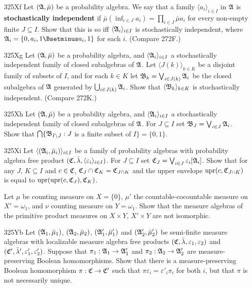 {\sqheader 325Xf Let $(\frak A,\bar\mu)$ be a probability
algebra.   We say that a family $\langle a_i\rangle_{i\in I}$ in
$\frak A$ is {\bf stochastically independent} if
$\bar\mu(\inf_{i\in J}a_i)=\prod_{i\in J}\bar\mu a_i$ for every non-empty
finite $J\subseteq I$.   Show that this is so iff
$\langle\frak A_i\rangle_{i\in I}$ is stochastically
independent, where $\frak A_i=\{0,a_i,1\Bsetminus a_i,1\}$ for each $i$.
(Compare 272F.)

\sqheader 325Xg Let $(\frak A,\bar\mu)$ be a probability
algebra, and $\langle\frak A_i\rangle_{i\in I}$ a stochastically
independent family of closed subalgebras of $\frak A$.   Let
$\langle J(k)\rangle_{k\in K}$ be a disjoint family of subsets of $I$,
and for each $k\in K$ let $\frak B_k=\bigvee_{i\in J(k)}\frak A_i$
be the closed subalgebra of $\frak A$
generated by $\bigcup_{i\in J(k)}\frak A_i$.   Show that
$\langle\frak B_k\rangle_{k\in K}$ is
stochastically independent.   (Compare 272K.)

\spheader 325Xh Let $(\frak A,\bar\mu)$ be a probability
algebra, and $\langle\frak A_i\rangle_{i\in I}$ a stochastically
independent family of closed subalgebras of $\frak A$.   For
$J\subseteq I$ set $\frak B_J=\bigvee_{i\in J}\frak A_i$.
Show that
$\bigcap\{\frak B_{I\setminus J}:J$ is a finite subset of $I\}=\{0,1\}$.

\spheader 325Xi Let
$\langle(\frak A_i,\bar\mu_i)\rangle_{i\in I}$ be a family of
probability algebras with probability algebra free
product $(\frak C,\bar\lambda,\langle\varepsilon_i\rangle_{i\in I})$.   For
$J\subseteq I$ set $\frak C_J=\bigvee_{i\in J}\varepsilon_i[\frak A_i]$.
Show that for any $J$, $K\subseteq I$ and $c\in\frak C$,
$\frak C_J\cap\frak C_K=\frak C_{J\cap K}$ and the upper envelope
$\mathop{\text{upr}}(c,\frak C_{J\cap K})$ is equal to
$\mathop{\text{upr}}(\mathop{\text{upr}}(c,\frak C_J),\frak C_K)$.

Let $\mu$ be counting measure on $X=\{0\}$, $\mu'$ the
countable-cocountable measure on $X'=\omega_1$, and $\nu$ counting
measure on $Y=\omega_1$.   Show that the measure algebras of the
primitive product measures on $X\times Y$, $X'\times Y$ are not
isomorphic.

\spheader 325Yb Let $(\frak A_1,\bar\mu_1)$, $(\frak A_2,\bar\mu_2)$,
$(\frak A'_1,\bar\mu'_1)$ and $(\frak A'_2,\bar\mu'_2)$ be semi-finite
measure algebras with localizable measure algebra free products
$(\frak C,\bar\lambda,\varepsilon_1,\varepsilon_2)$ and
$(\frak C',\bar\lambda',\varepsilon'_1,\varepsilon'_2)$.   Suppose that
$\pi_1:\frak A_1\to\frak A'_1$ and $\pi_2:\frak A_2\to\frak A'_2$ are
measure-preserving Boolean homomorphisms.   Show that there is a
measure-preserving Boolean homomorphism $\pi:\frak C\to\frak C'$ such that
$\pi\varepsilon_i=\varepsilon'_i\pi_i$ for both $i$, but that $\pi$ is not necessarily
unique.

}
